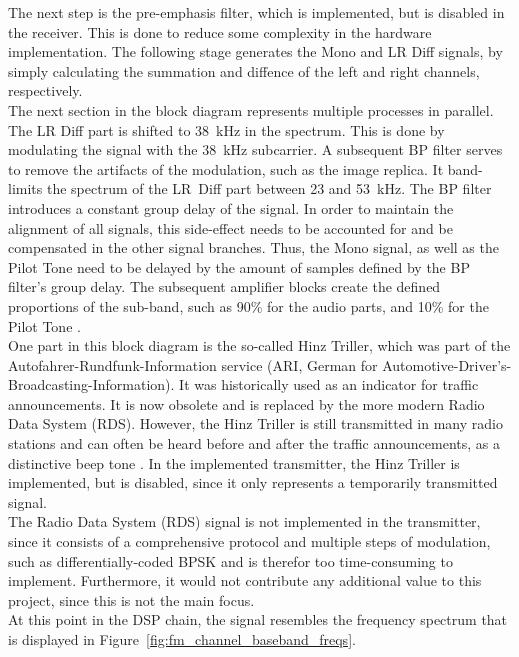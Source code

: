 The next step is the pre-emphasis filter, which is implemented, but is disabled in the receiver.
This is done to reduce some complexity in the hardware implementation.
The following stage generates the Mono and LR Diff signals, by simply calculating the summation and diffence of the left and right channels, respectively.\\

The next section in the block diagram represents multiple processes in parallel.
The LR Diff part is shifted to 38~kHz in the spectrum.
This is done by modulating the signal with the 38~kHz subcarrier.
A subsequent BP filter serves to remove the artifacts of the modulation, such as the image replica.
It band-limits the spectrum of the LR~Diff part between 23 and 53~kHz.
The BP filter introduces a constant group delay of the signal.
In order to maintain the alignment of all signals, this side-effect needs to be accounted for and be compensated in the other signal branches.
Thus, the Mono signal, as well as the Pilot Tone need to be delayed by the amount of samples defined by the BP filter's group delay.
The subsequent amplifier blocks create the defined proportions of the sub-band, such as 90\% for the audio parts, and 10\% for the Pilot Tone \cite{FmMultiplexingForStereo}.\\

One part in this block diagram is the so-called Hinz Triller, which was part of the Autofahrer-Rundfunk-Information service (ARI, German for Automotive-Driver's-Broadcasting-Information).
It was historically used as an indicator for traffic announcements.
It is now obsolete and is replaced by the more modern Radio Data System (RDS).
However, the Hinz Triller is still transmitted in many radio stations and can often be heard before and after the traffic announcements, as a distinctive beep tone \cite{HinzTriller}.
In the implemented transmitter, the Hinz Triller is implemented, but is disabled, since it only represents a temporarily transmitted signal.\\

The Radio Data System (RDS) signal is not implemented in the transmitter, since it consists of a comprehensive protocol and multiple steps of modulation, such as differentially-coded BPSK \cite{IntroFmStereoRdsModulation} and is therefor too time-consuming to implement.
Furthermore, it would not contribute any additional value to this project, since this is not the main focus.\\

At this point in the DSP chain, the signal resembles the frequency spectrum that is displayed in Figure~\ref{fig:fm_channel_baseband_freqs}.\\

